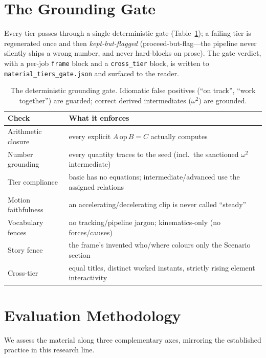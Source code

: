 \documentclass[11pt]{article}
\begin{document}
\section{The Grounding Gate}
Every tier passes through a single deterministic gate
(Table~\ref{tab:gate}); a failing tier is regenerated once and then
\emph{kept-but-flagged} (proceed-but-flag---the pipeline never silently ships a
wrong number, and never hard-blocks on prose). The gate verdict, with a
per-job \texttt{frame} block and a \texttt{cross\_tier} block, is written to
\texttt{material\_tiers\_gate.json} and surfaced to the reader.

\begin{table}[t]
  \centering
  \small
  \begin{tabular}{@{}ll@{}}
    \toprule
    Check & What it enforces \\
    \midrule
    Arithmetic closure   & every explicit $A\,\mathrm{op}\,B=C$ actually computes \\
    Number grounding     & every quantity traces to the seed (incl.\ the sanctioned $\omega^2$ intermediate) \\
    Tier compliance      & basic has no equations; intermediate/advanced use the assigned relations \\
    Motion faithfulness  & an accelerating/decelerating clip is never called ``steady'' \\
    Vocabulary fences     & no tracking/pipeline jargon; kinematics-only (no forces/causes) \\
    Story fence          & the frame's invented who/where colours only the Scenario section \\
    Cross-tier           & equal titles, distinct worked instants, strictly rising element interactivity \\
    \bottomrule
  \end{tabular}
  \caption{The deterministic grounding gate. Idiomatic false positives (``on
  track'', ``work together'') are guarded; correct derived intermediates
  ($\omega^2$) are grounded.}
  \label{tab:gate}
\end{table}

\section{Evaluation Methodology}
We assess the material along three complementary axes, mirroring the
established practice in this research line.
\end{document}
